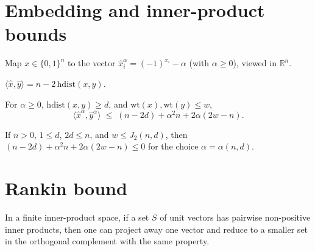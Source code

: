 \section{Embedding and inner-product bounds}

\begin{definition}
\leanok
Map $x \in \{0,1\}^n$ to the vector $\hat{x}^\alpha_i = (-1)^{x_i} - \alpha$
(with $\alpha \ge 0$), viewed in $\mathbb{R}^n$.
\end{definition}

\begin{lemma}
\leanok
{}
$\langle\hat{x},\hat{y}\rangle = n - 2\,\mathrm{hdist}(x,y)$.
\end{lemma}

\begin{lemma}
\leanok
{}
For $\alpha \ge 0$, $\mathrm{hdist}(x,y) \ge d$, and $\mathrm{wt}(x),\mathrm{wt}(y) \le w$,
\[
\bigl\langle\hat{x}^\alpha,\hat{y}^\alpha\bigr\rangle
\;\le\;
(n - 2d) + \alpha^2 n + 2\alpha(2w - n).
\]
\end{lemma}

\begin{lemma}
\leanok
{}
If $n > 0$, $1 \le d$, $2d \le n$, and $w \le J_2(n,d)$, then
$(n - 2d) + \alpha^2 n + 2\alpha(2w - n) \le 0$ for the choice $\alpha = \alpha(n,d)$.
\end{lemma}

\section{Rankin bound}

\begin{lemma}
\notready
In a finite inner-product space, if a set $S$ of unit vectors has pairwise
non-positive inner products, then one can project away one vector and
reduce to a smaller set in the orthogonal complement with the same property.
\end{lemma}

